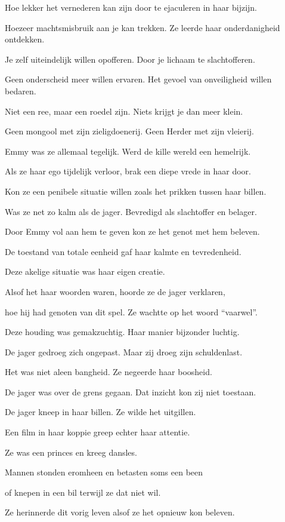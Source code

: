 Hoe lekker het vernederen kan zijn
door te ejaculeren in haar bijzijn.

Hoezeer machtsmisbruik aan je kan trekken.
Ze leerde haar onderdanigheid ontdekken.

Je zelf uiteindelijk willen opofferen.
Door je lichaam te slachtofferen.

Geen onderscheid meer willen ervaren.
Het gevoel van onveiligheid willen bedaren.

Niet een ree, maar een roedel zijn.
Niets krijgt je dan meer klein.

Geen mongool met zijn zieligdoenerij.
Geen Herder met zijn vleierij.

Emmy was ze allemaal tegelijk.
Werd de kille wereld een hemelrijk.

Als ze haar ego tijdelijk verloor,
brak een diepe vrede in haar door.

Kon ze een penibele situatie willen
zoals het prikken tussen haar billen.

Was ze net zo kalm als de jager.
Bevredigd als slachtoffer en belager.

Door Emmy vol aan hem te geven
kon ze het genot met hem beleven.

De toestand van totale eenheid
gaf haar kalmte en tevredenheid.

Deze akelige situatie
was haar eigen creatie.

Alsof het haar woorden waren,
hoorde ze de jager verklaren,

hoe hij had genoten van dit spel.
Ze wachtte op het woord “vaarwel”.

Deze houding was gemakzuchtig.
Haar manier bijzonder luchtig.

De jager gedroeg zich ongepast.
Maar zij droeg zijn schuldenlast.

Het was niet aleen bangheid.
Ze negeerde haar boosheid.

De jager was over de grens gegaan.
Dat inzicht kon zij niet toestaan.

De jager kneep in haar billen.
Ze wilde het uitgillen.

Een film in haar koppie
greep echter haar attentie.

Ze was een princes
en kreeg dansles.

Mannen stonden eromheen
en betasten soms een been

of knepen in een bil
terwijl ze dat niet wil.

Ze herinnerde dit vorig leven
alsof ze het opnieuw kon beleven.

